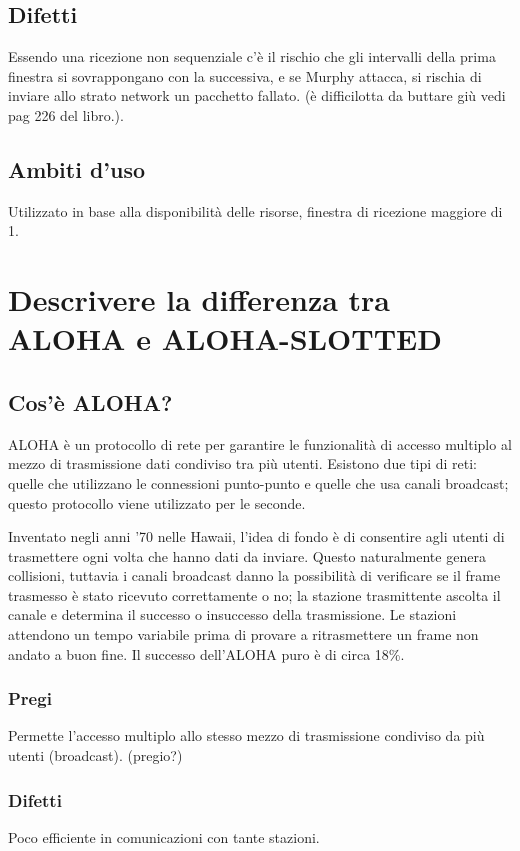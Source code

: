 \subsection{Difetti}
Essendo una ricezione non sequenziale c'è il rischio che gli intervalli della prima finestra si sovrappongano con la successiva, e se Murphy attacca,
si rischia di inviare allo strato network un pacchetto fallato. (è difficilotta da buttare giù vedi pag 226 del libro.).

\subsection{Ambiti d'uso}
Utilizzato in base alla disponibilità delle risorse, finestra di ricezione maggiore di 1.

\section{Descrivere la differenza tra ALOHA e ALOHA-SLOTTED}
\subsection{Cos'è ALOHA?}
ALOHA è un protocollo di rete per garantire le funzionalità di accesso multiplo al mezzo di trasmissione dati condiviso tra più utenti.
Esistono due tipi di reti: quelle che utilizzano le connessioni punto-punto e quelle che usa canali broadcast;
questo protocollo viene utilizzato per le seconde.

Inventato negli anni ’70 nelle Hawaii, l’idea di fondo è di consentire agli utenti di trasmettere ogni volta che hanno dati da inviare.
Questo naturalmente genera collisioni, tuttavia i canali broadcast danno la possibilità di verificare se il frame trasmesso è stato ricevuto correttamente o no;
la stazione trasmittente ascolta il canale e determina il successo o insuccesso della trasmissione.
Le stazioni attendono un tempo variabile prima di provare a ritrasmettere un frame non andato a buon fine.
Il successo dell’ALOHA puro è di circa 18\%.

\subsubsection{Pregi}
Permette l'accesso multiplo allo stesso mezzo di trasmissione condiviso da più utenti (broadcast). (pregio?)

\subsubsection{Difetti}
Poco efficiente in comunicazioni con tante stazioni.

